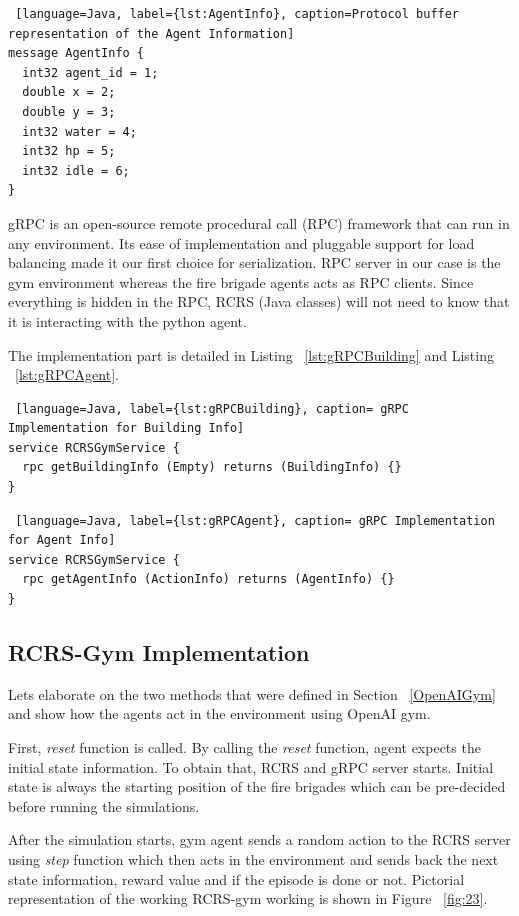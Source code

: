 \documentclass[12pt]{report}
\begin{document}
\begin{lstlisting} [language=Java, label={lst:AgentInfo}, caption=Protocol buffer representation of the Agent Information] 
message AgentInfo {
  int32 agent_id = 1;
  double x = 2;
  double y = 3; 
  int32 water = 4;
  int32 hp = 5; 
  int32 idle = 6;
}
\end{lstlisting}

gRPC is an open-source remote procedural call (RPC) framework that can run in any environment. Its ease of implementation and pluggable support for load balancing made it our first choice for serialization. 
RPC server in our case is the gym environment whereas the fire brigade agents acts as RPC clients. Since everything is hidden in the RPC, RCRS (Java classes) will not need to know that it is interacting with the python agent. 

The implementation part is detailed in Listing ~\ref{lst:gRPCBuilding} and Listing ~\ref{lst:gRPCAgent}. 

\begin{lstlisting} [language=Java, label={lst:gRPCBuilding}, caption= gRPC Implementation for Building Info] 
service RCRSGymService {
  rpc getBuildingInfo (Empty) returns (BuildingInfo) {}
}
\end{lstlisting}

\begin{lstlisting} [language=Java, label={lst:gRPCAgent}, caption= gRPC Implementation for Agent Info] 
service RCRSGymService {
  rpc getAgentInfo (ActionInfo) returns (AgentInfo) {}
}
\end{lstlisting}

\subsection{RCRS-Gym Implementation} \label{RCRSGymImplementation}

Lets elaborate on the two methods that were defined in Section ~\ref{OpenAIGym} and show how the agents act in the environment using OpenAI gym. 

First, \emph{reset} function is called. By calling the \emph{reset} function, agent expects the initial state information. To obtain that, RCRS and gRPC server starts. Initial state is always the starting position of the fire brigades which can be pre-decided before running the simulations.

After the simulation starts, gym agent sends a random action to the RCRS server using \emph{step} function which then acts in the environment and sends back the next state information, reward value and if the episode is done or not. Pictorial representation of the working RCRS-gym working is shown in Figure ~\ref{fig:23}. 
\end{document}
